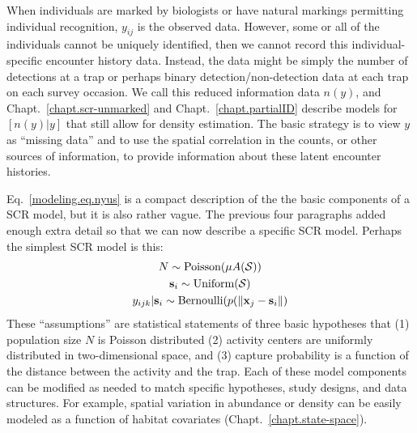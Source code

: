 When individuals are marked by biologists or have natural markings
permitting individual recognition, $y_{ij}$ is the observed
data. However, some or all of the individuals cannot be uniquely
identified, then we cannot record this individual-specific encounter
history data. Instead, the data might be simply the number of
detections at a trap or perhaps binary detection/non-detection data at
each trap on each survey occasion. We call this reduced information data $n(y)$, and
Chapt.~\ref{chapt.scr-unmarked} and Chapt.~\ref{chapt.partialID} describe
models for $[n(y)|y]$ that still allow for density estimation. The
basic strategy is to view $y$ as ``missing
data'' and to use the spatial correlation in the counts, or other
sources of information, to provide information about these latent
encounter histories.

Eq.~\ref{modeling.eq.nyus} is a compact description of the the basic components of a
SCR model, but it is also rather vague. The previous four paragraphs
added enough extra detail so that we can now describe a specific SCR
model. Perhaps the simplest SCR model is this:
\begin{gather}
N \sim \text{Poisson}(\mu A(\mathcal{S})) \nonumber \\
{\bf s}_{i} \sim \mbox{Uniform}({\cal S}) \label{modeling.eq.scr0} \\
y_{ijk} | {\bf s}_{i} \sim \mbox{Bernoulli}(p(\| {\bf x}_j - {\bf s}_{i} \|) \nonumber
\end{gather}
These ``assumptions'' are statistical statements of three basic hypotheses
that (1) population size $N$ is Poisson distributed
(2) activity centers are uniformly distributed in two-dimensional
space,
and (3) capture probability is a function of the distance
between the activity and the trap. Each of these model components can be
modified as needed to match specific hypotheses, study designs, and data
structures. For example, spatial variation in abundance or density can
be easily modeled as a function of habitat covariates
(Chapt.~\ref{chapt.state-space}).

